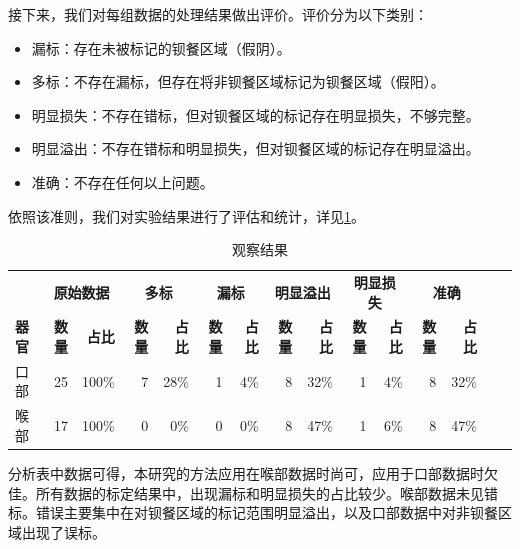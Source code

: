 接下来，我们对每组数据的处理结果做出评价。评价分为以下类别：
\begin{itemize}
    \item 漏标：存在未被标记的钡餐区域（假阴）。
    \item 多标：不存在漏标，但存在将非钡餐区域标记为钡餐区域（假阳）。
    \item 明显损失：不存在错标，但对钡餐区域的标记存在明显损失，不够完整。
    \item 明显溢出：不存在错标和明显损失，但对钡餐区域的标记存在明显溢出。
    \item 准确：不存在任何以上问题。
\end{itemize}

依照该准则，我们对实验结果进行了评估和统计，详见\cref{tab:5_result}。
\begin{table}[!htbp]
    \centering
    \begin{threeparttable}[b]
        \caption{观察结果}
        \label{tab:5_result}
        \begin{tabular}{@{}lrrrrrrrrrrrrrr@{}}
            \toprule
                & \multicolumn{2}{c}{\textbf{原始数据}} & \multicolumn{2}{c}{\textbf{多标}} & \multicolumn{2}{c}{\textbf{漏标}} & \multicolumn{2}{c}{\textbf{明显溢出}} & \multicolumn{2}{c}{\textbf{明显损失}} & \multicolumn{2}{c}{\textbf{准确}}\\
            \cmidrule(lr){2-3} \cmidrule(lr){4-5} \cmidrule(lr){6-7} \cmidrule(lr){8-9} \cmidrule(lr){10-11} \cmidrule(lr){12-13} \cmidrule(lr){14-15}
                \textbf{器官} & \textbf{数量} & \textbf{占比} & \textbf{数量} & \textbf{占比} & \textbf{数量} & \textbf{占比} & \textbf{数量} & \textbf{占比} & \textbf{数量} & \textbf{占比} & \textbf{数量} & \textbf{占比} \\
            \midrule
                口部            & 25      & 100\% & 7      & 28\% & 1      & 4\% & 8      & 32\% & 1      & 4\% & 8      & 32\%  \\
                喉部            & 17      & 100\% & 0      &  0\% & 0      & 0\% & 8      & 47\% & 1      & 6\% & 8      & 47\%  \\
            \bottomrule
        \end{tabular}
    \end{threeparttable}
\end{table}

分析表中数据可得，本研究的方法应用在喉部数据时尚可，应用于口部数据时欠佳。所有数据的标定结果中，出现漏标和明显损失的占比较少。喉部数据未见错标。错误主要集中在对钡餐区域的标记范围明显溢出，以及口部数据中对非钡餐区域出现了误标。

